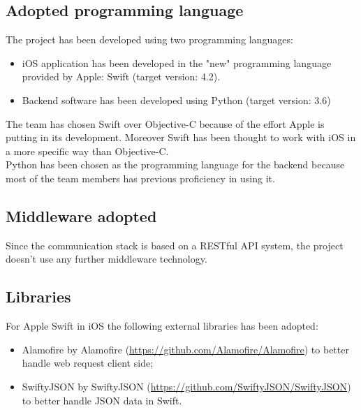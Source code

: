 \documentclass{article}
\begin{document}
\subsection{Adopted programming language}

The project has been developed using two programming languages:

\begin{itemize}
	\item iOS application has been developed in the "new" programming language provided by Apple: Swift (target version: 4.2).
	\item  Backend software has been developed using Python (target version: 3.6)
\end{itemize}

The team has chosen Swift over Objective-C because of the effort Apple is putting in its development. Moreover Swift has been thought to work with iOS in a more specific way than Objective-C.\\
Python has been chosen as the programming language for the backend because most of the team members has previous proficiency in using it.

\subsection{Middleware adopted}
Since the communication stack is based on a RESTful API system, the project doesn't use any further middleware technology.

\subsection{Libraries}
For Apple Swift in iOS the following external libraries has been adopted:
\begin{itemize}
	\item Alamofire by Alamofire (\url{https://github.com/Alamofire/Alamofire}) to better handle web request client side;
	\item SwiftyJSON by SwiftyJSON (\url{https://github.com/SwiftyJSON/SwiftyJSON}) to better handle JSON data in Swift.
\end{itemize}
\end{document}
